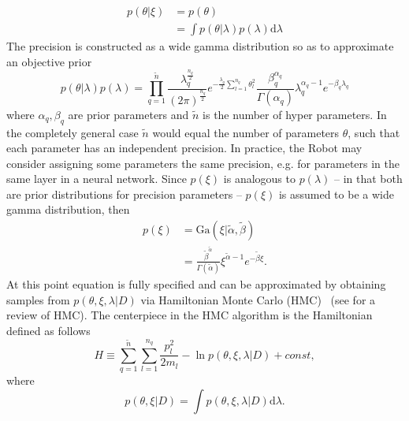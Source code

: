 \begin{equation}
	\begin{split}
		p(\theta|\xi) & = p(\theta)\\
		& = \int p(\theta|\lambda)p(\lambda) \mathrm{d}\lambda
	\end{split}
	\label{eq:prior1}
\end{equation}
The precision is constructed as a wide gamma distribution so as to approximate an objective prior
\begin{equation}
	p(\theta|\lambda)p(\lambda)
	= \prod_{q=1}^{\tilde{n}} \frac{\lambda_q^\frac{n_q}{2}}{(2\pi)^\frac{n_q}{2}}e^{-\frac{\lambda_q}{2}\sum_{l=1}^{n_q}\theta_l^2}\frac{\beta_q^{\alpha_q}}{\Gamma(\alpha_q)}\lambda_q^{\alpha_q-1}e^{-\beta_q \lambda_q}
	\label{eq:prior}
\end{equation}
where $\alpha_q,\beta_q$ are prior parameters and $\tilde{n}$ is the number of hyper parameters. In the completely general case $\tilde{n}$ would equal the number of parameters $\theta$, such that each parameter has an independent precision. In practice, the Robot may consider assigning some parameters the same precision, e.g. for parameters in the same layer in a neural network. Since $p(\xi)$ is analogous to $p(\lambda)$ -- in that both are prior distributions for precision parameters -- $p(\xi)$ is assumed to be a wide gamma distribution, then
\begin{equation}
	\begin{split}
		p(\xi) & = \text{Ga}(\xi|\tilde{\alpha},\tilde{\beta})\\
		& =\frac{\tilde{\beta}^{\tilde{\alpha}}}{\Gamma(\tilde{\alpha})}\xi^{\tilde{\alpha}-1}e^{-\tilde{\beta} \xi}.
	\end{split}
	\label{p7}
\end{equation}
At this point equation  is fully specified and can be approximated by obtaining samples from $p(\theta,\xi,\lambda|D)$ via Hamiltonian Monte Carlo (HMC)~\citep{Hammersley1964,Duane:1987de,Neal:1996,Neal2012} (see  for a review of HMC). The centerpiece in the HMC algorithm is the Hamiltonian defined as follows~\citep{Neal:1996,Neal2012}
\begin{equation}
	H \equiv  \sum_{q=1}^{\tilde{n}}\sum_{l=1}^{n_q}\frac{p_{l}^2}{2m_{l}}-\ln p(\theta,\xi,\lambda|D)+const,
	\label{eqh}
\end{equation}
where 
\begin{equation}
	p(\theta,\xi|D) = \int p(\theta,\xi,\lambda|D) \mathrm{d}\lambda.
	\label{eq:ss}
\end{equation}
